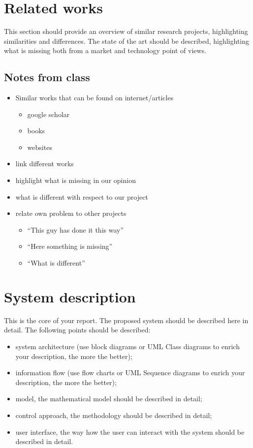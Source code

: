 \documentclass[11pt,a4paper]{report}
\begin{document}
	
	\section{Related works}
	This section should provide an overview of similar research projects, highlighting similarities and differences. The state of the art should be described, highlighting what is missing both from a market and technology point of views.
	
	\subsection{Notes from class}
	
	\begin{itemize}
		\item Similar works that can be found on internet/articles
		\begin{itemize}
			\item google scholar
			\item books
			\item websites
		\end{itemize}
		\item link different works 
		\item highlight what is missing in our opinion
		\item what is different with respect to our project
		\item relate own problem to other projects
		\begin{itemize}
			\item “This guy has done it this way”
			\item “Here something is missing”
			\item “What is different”
		\end{itemize}
	\end{itemize}
	
	\section{System description}
	This is the core of your report. The proposed system should be described here in detail. The following points should be described:
	\begin{itemize}
		\item system architecture (use block diagrams or UML Class diagrams to enrich your description, the more the better);
		\item information flow (use flow charts or UML Sequence diagrams to enrich your description, the more the better);
		\item model, the mathematical model should be described in detail;
		\item control approach, the methodology should be described in detail;
		\item user interface, the way how the user can interact with the system should be described in detail.
	\end{itemize}
	
\end{document}
